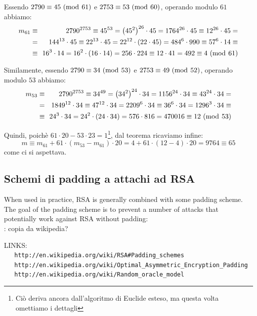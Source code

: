 \documentclass[pdflatex,11pt,a4paper,oneside]{article}
\let\OldEmph\emph
\renewcommand{\emph}[1]{\OldEmph{#1\/}}
\newcommand{\XXX}[1][XXX]{\text{\bfseries{\color{red}{\emph{#1}}}}}
\newcommand{\TODO}[0]{\XXX[TODO]}
\newcommand{\p}[1]{\left({#1}\right)}
\newcommand{\congruent}[0]{\equiv}
\newcommand{\mmodop}[0]{\ensuremath{\operatorname{mod}}}
\newcommand{\mmod}[1]{\ensuremath{\allowbreak\ (\mmodop\:{#1})}}
\begin{document}
\noindent
Essendo $2790 \congruent 45 \mmod{61}$ e $2753 \congruent 53 \mmod{60}$,
operando modulo $61$ abbiamo:
\begin{eqnarray*}
m_{61}
  & \congruent\!\! &
    2790^{2753} \congruent {45}^{53} = \p{{45}^2}^{26} \cdot 45
    = 1764^{26} \cdot 45  \congruent 12^{26} \cdot 45 =
  \\
  & =\!\! &
    144^{13} \cdot 45 \congruent 22^{13} \cdot 45
    = 22^{12} \cdot \p{22 \cdot 45} = {484}^6 \cdot 990
    \congruent {57}^6 \cdot 14 \congruent
  \\
  &\congruent\!\! &
    16^3 \cdot 14 = 16^2 \cdot \p{16 \cdot 14} = 256 \cdot 224
    \congruent 12 \cdot 41 = 492 \congruent 4 \mmod{61}
\end{eqnarray*}

\noindent
Similamente, essendo $2790 \congruent 34 \mmod{53}$ e
$2753 \congruent 49 \mmod{52}$, operando modulo $53$ abbiamo:
\begin{eqnarray*}
m_{53}
  & \congruent\!\! &
    2790^{2753} \congruent {34}^{49} = \p{{34}^2}^{24} \cdot 34 =
    1156^{24} \cdot 34 \congruent 43^{24} \cdot 34 =
  \\
  & =\!\! &
    1849^{12} \cdot 34 \congruent 47^{12} \cdot 34 = {2209}^6 \cdot 34
    \congruent 36^6 \cdot 34 = 1296^3 \cdot 34 \congruent
  \\
  & \congruent\!\! &
    24^3 \cdot 34 = 24^2 \cdot \p{24 \cdot 34} = 576 \cdot 816 = 470016
    \congruent 12 \mmod{53}
\end{eqnarray*}

\noindent
Quindi, poich\`e $61 \cdot 20 - 53 \cdot 23 = 1$\footnote{Ci\`o deriva
ancora dall'algoritmo di Euclide esteso, ma questa volta omettiamo i
dettagli}, dal teorema{\XXX} ricaviamo infine:
\begin{displaymath}
  m \congruent m_{61} + 61 \cdot \p{m_{53} - m_{61}} \cdot 20
    = 4 + 61 \cdot \p{12 - 4} \cdot 20 = 9764 \congruent 65
\end{displaymath}
come ci si aspettava.

\subsection{Schemi di padding a attachi ad RSA}

When used in practice, RSA is generally combined with some padding scheme.
The goal of the padding scheme is to prevent a number of attacks that
potentially work against RSA without padding:\\
\TODO: copia da wikipedia?

LINKS:\\
~~~\verb+http://en.wikipedia.org/wiki/RSA#Padding_schemes+\\
~~~\verb+http://en.wikipedia.org/wiki/Optimal_Asymmetric_Encryption_Padding+
~~~\verb+http://en.wikipedia.org/wiki/Random_oracle_model+

\end{document}
